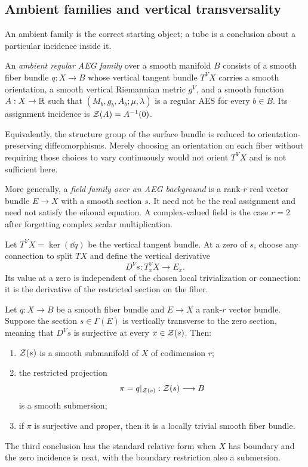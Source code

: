\subsection{Ambient families and vertical transversality}

An ambient family is the correct starting object; a tube is a conclusion about a
particular incidence inside it.

\begin{definition}
\label{def:ambient-aeg-family}
An \emph{ambient regular AEG family} over a smooth manifold $B$ consists of a
smooth fiber bundle $q:X\to B$ whose vertical tangent bundle $T^VX$ carries a
smooth orientation, a smooth vertical Riemannian metric $g^V$, and a smooth
function $A:X\to\mathbb{R}$ such that
$(M_b,g_b,A_b;\mu,\lambda)$ is a regular AES for every $b\in B$.  Its assignment
incidence is $\mathcal Z(A)=A^{-1}(0)$.

Equivalently, the structure group of the surface bundle is reduced to
orientation-preserving diffeomorphisms.  Merely choosing an orientation on each
fiber without requiring those choices to vary continuously would not orient
$T^VX$ and is not sufficient here.

More generally, a \emph{field family over an AEG background} is a rank-$r$ real
vector bundle $E\to X$ with a smooth section $s$.  It need not be the real
assignment and need not satisfy the eikonal equation.  A complex-valued field is
the case $r=2$ after forgetting complex scalar multiplication.
\end{definition}

Let $T^VX=\ker(\dd q)$ be the vertical tangent bundle.  At a zero of $s$, choose
any connection to split $TX$ and define the vertical derivative
\[
 D^Vs:T^V_xX\longrightarrow E_x.
\]
Its value at a zero is independent of the chosen local trivialization or
connection: it is the derivative of the restricted section on the fiber.

\begin{theorem}
\label{thm:parameterized-zero-section}
Let $q:X\to B$ be a smooth fiber bundle and $E\to X$ a rank-$r$ vector bundle.
Suppose the section $s\in\Gamma(E)$ is vertically transverse to the zero section,
meaning that $D^Vs$ is surjective at every $x\in\mathcal Z(s)$.  Then:
\begin{enumerate}
\item $\mathcal Z(s)$ is a smooth submanifold of $X$ of codimension $r$;
\item the restricted projection
\[
 \pi=q|_{\mathcal Z(s)}:\mathcal Z(s)\longrightarrow B
 \]
is a smooth submersion;
\item if $\pi$ is surjective and proper, then it is a locally trivial smooth
fiber bundle.
\end{enumerate}
The third conclusion has the standard relative form when $X$ has boundary and the
zero incidence is neat, with the boundary restriction also a submersion.
\end{theorem}

